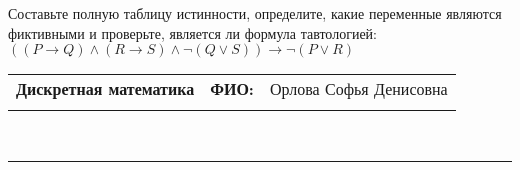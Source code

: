 \documentclass[10pt]{exam}
\newcommand{\class}{Дискретная математика}
\newcommand{\examdate}{}
\begin{document}
\begin{questions}
\begin{enumerate} [a)]
\end{enumerate}\question Составьте полную таблицу истинности, определите, какие переменные являются фиктивными и проверьте, является ли формула тавтологией:
$((P \rightarrow Q) \land (R \rightarrow S) \land \neg (Q \lor S)) \rightarrow \neg (P \lor R)$

\end{questions}
\newpage
\begin{flushright}
\begin{tabular}{p{2.8in} r l}
\textbf{\class} & \textbf{ФИО:} &Орлова Софья Денисовна
\\

\textbf{\examdate} &&\\
\end{tabular}\\
\end{flushright}
\rule[1ex]{\textwidth}{.1pt}
\end{document}

